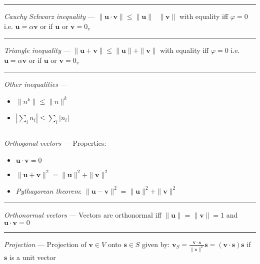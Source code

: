 {\color{lightgray}\hrule height 0.001mm}

\emph{Cauchy Schwarz inequality} --- 
$\|\boldsymbol{u} \cdot \boldsymbol{v}\| \leq \|\boldsymbol{u}\| \textrm{ } \|\boldsymbol{v}\|$ with equality iff $\varphi = 0$ i.e. $\boldsymbol{u} = \alpha\boldsymbol{v}$ or if $\boldsymbol{u} \textrm{ or } \boldsymbol{v} = 0_v$\\

{\color{lightgray}\hrule height 0.001mm}

\emph{Triangle inequality} --- 
$\|\boldsymbol{u} + \boldsymbol{v}\| \leq \|\boldsymbol{u}\| + \|\boldsymbol{v}\|$ with equality iff $\varphi = 0$ i.e. $\boldsymbol{u} = \alpha\boldsymbol{v}$ or if $\boldsymbol{u} \textrm{ or } \boldsymbol{v} = 0_v$

{\color{lightgray}\hrule height 0.001mm}

\emph{Other inequalities} ---  

\begin{itemize}
    \item $\|n^k\| \leq \|n\|^k$
    \item $|\sum_i n_i| \leq \sum_i |n_i|$
\end{itemize}

{\color{lightgray}\hrule height 0.001mm}

\emph{Orthogonal vectors} ---  Properties:
\begin{itemize}
    \item $\boldsymbol{u} \cdot \boldsymbol{v} = 0$
    \item $\|\boldsymbol{u} + \boldsymbol{v}\|^2 = \|\boldsymbol{u}\|^2 + \|\boldsymbol{v}\|^2$
    \item \emph{Pythagorean theorem}: $\|\boldsymbol{u} - \boldsymbol{v}\|^2 = \|\boldsymbol{u}\|^2 + \|\boldsymbol{v}\|^2$
\end{itemize}

{\color{lightgray}\hrule height 0.001mm}

\emph{Orthonormal vectors} ---  Vectors are orthonormal iff $\|\boldsymbol{u}\| = \|\boldsymbol{v}\| = 1$ and $\boldsymbol{u} \cdot \boldsymbol{v} = 0$

{\color{lightgray}\hrule height 0.001mm}

\emph{Projection} --- Projection of $\boldsymbol{v} \in V$ onto $\boldsymbol{s} \in S$ given by: $\boldsymbol{v}_S = \frac{\boldsymbol{v} \cdot \boldsymbol{s}}{\|\boldsymbol{s}\|^2}\boldsymbol{s} = (\boldsymbol{v} \cdot \boldsymbol{s})\boldsymbol{s}$ if $\boldsymbol{s}$ is a unit vector

